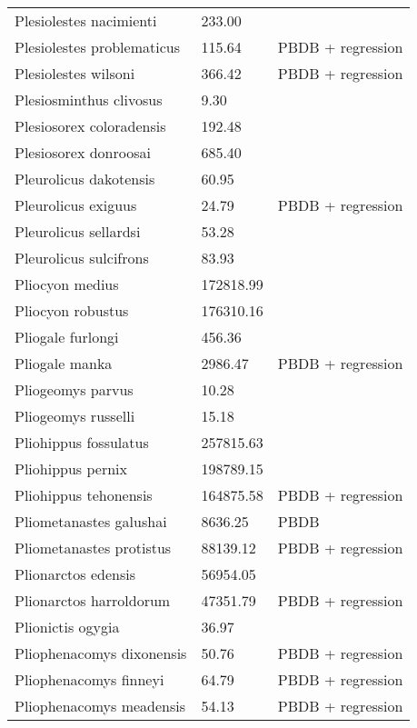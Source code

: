 \documentclass{article}
\begin{document}
\begin{center}
\begin{longtable}{p{} p{} p{} }
  Plesiolestes nacimienti & 233.00 & \cite{Soligo2006} \\ 
  Plesiolestes problematicus & 115.64 & PBDB + regression \\ 
  Plesiolestes wilsoni & 366.42 & PBDB + regression \\ 
  Plesiosminthus clivosus & 9.30 & \cite{Tomiya2013} \\ 
  Plesiosorex coloradensis & 192.48 & \cite{Tomiya2013} \\ 
  Plesiosorex donroosai & 685.40 & \cite{Tomiya2013} \\ 
  Pleurolicus dakotensis & 60.95 & \cite{Tomiya2013} \\ 
  Pleurolicus exiguus & 24.79 & PBDB + regression \\ 
  Pleurolicus sellardsi & 53.28 & \cite{Zakrzewski1991a} \\ 
  Pleurolicus sulcifrons & 83.93 & \cite{Tomiya2013} \\ 
  Pliocyon medius & 172818.99 & \cite{Tomiya2013} \\ 
  Pliocyon robustus & 176310.16 & \cite{Tomiya2013} \\ 
  Pliogale furlongi & 456.36 & \cite{Wood1962} \\ 
  Pliogale manka & 2986.47 & PBDB + regression \\ 
  Pliogeomys parvus & 10.28 & \cite{Tomiya2013} \\ 
  Pliogeomys russelli & 15.18 & \cite{Tomiya2013} \\ 
  Pliohippus fossulatus & 257815.63 & \cite{Tomiya2013} \\ 
  Pliohippus pernix & 198789.15 & \cite{Tomiya2013} \\ 
  Pliohippus tehonensis & 164875.58 & PBDB + regression \\ 
  Pliometanastes galushai & 8636.25 & PBDB \\ 
  Pliometanastes protistus & 88139.12 & PBDB + regression \\ 
  Plionarctos edensis & 56954.05 & \cite{Tomiya2013} \\ 
  Plionarctos harroldorum & 47351.79 & PBDB + regression \\ 
  Plionictis ogygia & 36.97 & \cite{Tomiya2013} \\ 
  Pliophenacomys dixonensis & 50.76 & PBDB + regression \\ 
  Pliophenacomys finneyi & 64.79 & PBDB + regression \\ 
  Pliophenacomys meadensis & 54.13 & PBDB + regression \\ 

\end{longtable}
\end{center}
\end{document}
